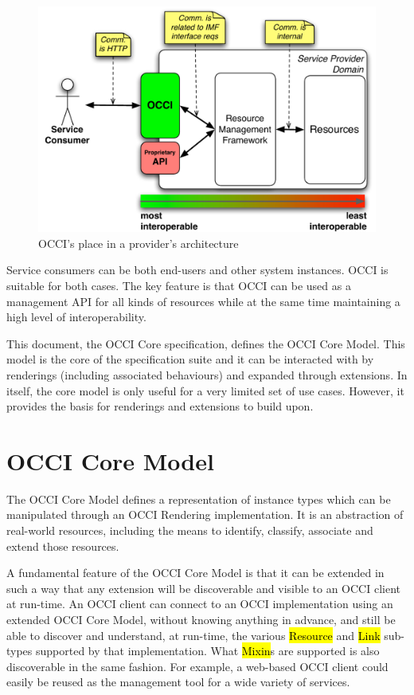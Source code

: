 \documentclass[10pt,a4paper]{article}
\begin{document}
\begin{figure}[h]
  \centering
  \includegraphics[scale=0.5]{figs/occi-intro.pdf}
  \caption{OCCI's place in a provider's architecture}
  \label{fig:placement}
\end{figure}

Service consumers can be both end-users and other system
instances. OCCI is suitable for both cases. The key feature is that
OCCI can be used as a management API for all kinds of resources while
at the same time maintaining a high level of interoperability.

This document, the OCCI Core specification, defines the OCCI Core
Model. This model is the core of the specification suite and it can be
interacted with by renderings (including associated behaviours) and
expanded through extensions. In itself, the core model is only useful
for a very limited set of use cases. However, it provides the basis
for renderings and extensions to build upon.

\section{OCCI Core Model}
The OCCI Core Model defines a representation of instance types which
can be manipulated through an OCCI Rendering implementation.  It is an
abstraction of real-world resources, including the means to identify,
classify, associate and extend those resources.

A fundamental feature of the OCCI Core Model is that it can be
extended in such a way that any extension will be discoverable and
visible to an OCCI client at run-time. An OCCI client can connect to
an OCCI implementation using an extended OCCI Core Model, without
knowing anything in advance, and still be able to discover and
understand, at run-time, the various \hl{Resource} and \hl{Link}
sub-types supported by that implementation. What \hl{Mixin}s are
supported is also discoverable in the same fashion. For example, a
web-based OCCI client could easily be reused as the management tool
for a wide variety of services.
\end{document}
